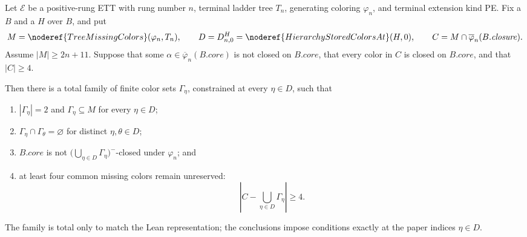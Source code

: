 \begin{lemma}
Let $\mathcal E$ be a positive-rung ETT with rung number $n$, terminal
ladder tree $T_n$, generating coloring $\varphi_n$, and terminal extension
kind PE.  Fix a  $B$ and a
 $H$ over $B$, and put
\[
 M=\noderef{TreeMissingColors}(\varphi_n,T_n),\qquad
 D=D^H_{n,0}=\noderef{HierarchyStoredColorsAt}(H,0),
 \qquad C=M\cap\overline\varphi_n(B.\mathit{closure}).
\]
Assume $|M|\geq2n+11$.  Suppose that some
$\alpha\in\overline\varphi_n(B.\mathit{core})$ is not closed on
$B.\mathit{core}$, that every color in $C$ is closed on
$B.\mathit{core}$, and that $|C|\geq4$.

Then there is a total family of finite color sets $\Gamma_\eta$, constrained
at every $\eta\in D$, such that
\begin{enumerate}
\item $|\Gamma_\eta|=2$ and $\Gamma_\eta\subseteq M$ for every
  $\eta\in D$;
\item $\Gamma_\eta\cap\Gamma_\theta=\varnothing$ for distinct
  $\eta,\theta\in D$;
\item $B.\mathit{core}$ is not
  $\bigl(\bigcup_{\eta\in D}\Gamma_\eta\bigr)^-$-closed under
  $\varphi_n$; and
\item at least four common missing colors remain unreserved:
  \[
  \left|C-\bigcup_{\eta\in D}\Gamma_\eta\right|\geq4.
  \]
\end{enumerate}
The family is total only to match the Lean representation; the conclusions
impose conditions exactly at the paper indices $\eta\in D$.
\end{lemma}
